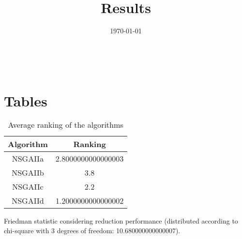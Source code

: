 \documentclass{article}
\title{Results}
\author{}
\date{\today}
\begin{document}
\oddsidemargin 0in \topmargin 0in\maketitle
\
\section{Tables}
\begin{table}[!htp]
\centering
\caption{Average ranking of the algorithms}
\begin{tabular}{c|c}
Algorithm&Ranking\\
\hline
NSGAIIa&2.8000000000000003\\
NSGAIIb&3.8\\
NSGAIIc&2.2\\
NSGAIId&1.2000000000000002\\
\end{tabular}
\end{table}


Friedman statistic considering reduction performance (distributed according to chi-square with 3 degrees of freedom: 10.680000000000007).
\end{document}
